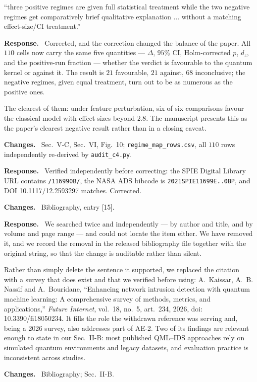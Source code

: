 \documentclass[11pt,a4paper]{article}
\newenvironment{revcomment}
  {\par\addvspace{6pt}\begingroup
   \color{quotegray}\itshape\small
   \begin{list}{}{%
     \setlength{\leftmargin}{1.8em}\setlength{\rightmargin}{1.0em}%
     \setlength{\topsep}{0pt}\setlength{\partopsep}{0pt}%
     \setlength{\parsep}{3pt}\setlength{\itemsep}{0pt}}%
   \item[]}
  {\end{list}\endgroup\normalcolor\addvspace{6pt}}
\newcommand{\itemhead}[2]{%
  \par\addvspace{15pt}%
  \noindent{\bfseries\color{tagink}#1}\hspace{0.7em}{\bfseries #2}%
  \par\addvspace{3.5pt}%
  \noindent{\color{rulegray}\rule{\linewidth}{0.5pt}}%
  \par\addvspace{5pt}%
  \nobreak}
\newcommand{\resp}{\par\addvspace{2pt}\noindent\textbf{Response.}\ }
\newcommand{\changed}{\par\addvspace{5pt}\noindent
  {\bfseries\color{tagink}Changes.}\ }
\begin{document}
\itemhead{R2-4}{Regime map oversells: positive regimes get full statistics,
negative regimes only qualitative treatment}
\begin{revcomment}
``three positive regimes are given full statistical treatment while the two
negative regimes get comparatively brief qualitative explanation $\ldots$
without a matching effect-size/CI treatment.''
\end{revcomment}
\resp
Corrected, and the correction changed the balance of the paper. All $110$ cells
now carry the same five quantities --- $\Delta$, $95\%$ CI, Holm-corrected $p$,
$d_z$, and the positive-run fraction --- whether the verdict is favourable to
the quantum kernel or against it. The result is $21$ favourable, $21$ against,
$68$ inconclusive; the negative regimes, given equal treatment, turn out to be
as numerous as the positive ones.

The clearest of them: under feature perturbation, six of six comparisons favour
the classical model with effect sizes beyond $2.8$. The manuscript presents this
as the paper's clearest negative result rather than in a closing caveat.
\changed
Sec.~V-C, Sec.~VI, Fig.~10; \texttt{regime\_map\_rows.csv}, all $110$ rows
independently re-derived by \texttt{audit\_c4.py}.

\itemhead{R2-5}{Reference [15]: article number 116990F should be 116990B}
\resp
Verified independently before correcting: the SPIE Digital Library URL contains
\texttt{/116990B/}, the NASA ADS bibcode is \texttt{2021SPIE11699E..0BP}, and
DOI 10.1117/12.2593297 matches. Corrected.
\changed
Bibliography, entry [15].

\itemhead{R2-6}{Reference [26] could not be located; looks fabricated or badly
misattributed}
\resp
We searched twice and independently --- by author and title, and by volume and
page range --- and could not locate the item either. We have removed it, and we
record the removal in the released bibliography file together with the original
string, so that the change is auditable rather than silent.

Rather than simply delete the sentence it supported, we replaced the citation
with a survey that does exist and that we verified before using: A.~Kaissar,
A.~B. Nassif and A.~Bouridane, ``Enhancing network intrusion detection with
quantum machine learning: A comprehensive survey of methods, metrics, and
applications,'' \emph{Future Internet}, vol.~18, no.~5, art.~234, 2026, doi:
10.3390/fi18050234. It fills the role the withdrawn reference was serving and,
being a 2026 survey, also addresses part of AE-2. Two of its findings are
relevant enough to state in our Sec.~II-B: most published QML--IDS approaches
rely on simulated quantum environments and legacy datasets, and evaluation
practice is inconsistent across studies.
\changed
Bibliography; Sec.~II-B.
\end{document}
